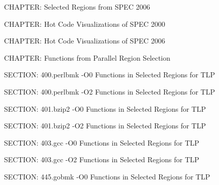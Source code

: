 {%





CHAPTER: Selected Regions from SPEC 2006


CHAPTER: Hot Code Visualizations of SPEC 2000


CHAPTER: Hot Code Visualizations of SPEC 2006





CHAPTER: Functions from Parallel Region Selection


SECTION: 400.perlbmk -O0 Functions in Selected Regions for TLP
 {\small  }

SECTION: 400.perlbmk -O2 Functions in Selected Regions for TLP
 {\small  }

SECTION: 401.bzip2 -O0 Functions in Selected Regions for TLP
 {\small  }

SECTION: 401.bzip2 -O2 Functions in Selected Regions for TLP
 {\small  }

SECTION: 403.gcc -O0 Functions in Selected Regions for TLP
 {\small  }

SECTION: 403.gcc -O2 Functions in Selected Regions for TLP
 {\small  }

SECTION: 445.gobmk -O0 Functions in Selected Regions for TLP
 {\small  }

}
